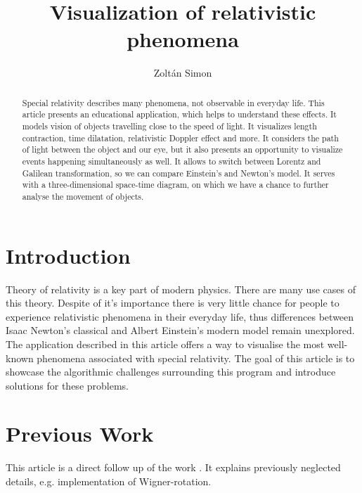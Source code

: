 \documentclass{egpubl}
\title{Visualization of relativistic phenomena}
\author{Zoltán Simon
}
\begin{document}
\maketitle

\begin{abstract}
Special relativity describes many phenomena, not observable in everyday life. This article presents an educational application, which helps to understand these effects. It models vision of objects travelling close to the speed of light. It visualizes length contraction, time dilatation, relativistic Doppler effect and more. It considers the path of light between the object and our eye, but it also presents an opportunity to visualize events happening simultaneously as well. It allows to switch between Lorentz and Galilean transformation, so we can compare Einstein's and Newton's model. It serves with a three-dimensional space-time diagram, on which we have a chance to further analyse the movement of objects.
\begin{classification} %
\end{classification}

\end{abstract}

\section{Introduction}
Theory of relativity is a key part of modern physics. There are many use cases of this theory. Despite of it's importance there is very little chance for people to experience relativistic phenomena in their everyday life, thus differences between Isaac Newton's classical and Albert Einstein's modern model remain unexplored. The application described in this article offers a way to visualise the most well-known phenomena associated with special relativity. The goal of this article is to showcase the algorithmic challenges surrounding this program and introduce solutions for these problems. 


\section{Previous Work}

This article is a direct follow up of the work \cite{TDKreport}. It explains previously neglected details, e.g. implementation of Wigner-rotation. 
\end{document}
